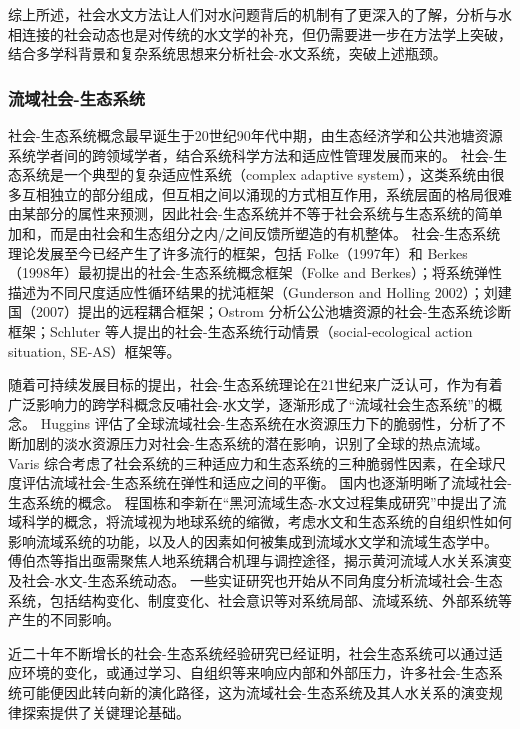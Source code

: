 综上所述，社会水文方法让人们对水问题背后的机制有了更深入的了解，分析与水相连接的社会动态也是对传统的水文学的补充，但仍需要进一步在方法学上突破，结合多学科背景和复杂系统思想来分析社会-水文系统，突破上述瓶颈。


\subsubsection*{流域社会-生态系统}

社会-生态系统概念最早诞生于20世纪90年代中期，由生态经济学和公共池塘资源系统学者间的跨领域学者，结合系统科学方法和适应性管理发展而来的\cite{biggs2021}。
社会-生态系统是一个典型的复杂适应性系统（complex adaptive system），这类系统由很多互相独立的部分组成，但互相之间以涌现的方式相互作用，系统层面的格局很难由某部分的属性来预测，因此社会-生态系统并不等于社会系统与生态系统的简单加和，而是由社会和生态组分之内/之间反馈所塑造的有机整体。 %
社会-生态系统理论发展至今已经产生了许多流行的框架，包括 Folke（1997年）和 Berkes （1998年）最初提出的社会-生态系统概念框架（Folke and Berkes）；将系统弹性描述为不同尺度适应性循环结果的扰沌框架（Gunderson and Holling 2002）；刘建国（2007）提出的远程耦合框架；Ostrom 分析公公池塘资源的社会-生态系统诊断框架；Schluter 等人提出的社会-生态系统行动情景（social-ecological action situation, SE-AS）框架等。

随着可持续发展目标的提出，社会-生态系统理论在21世纪来广泛认可，作为有着广泛影响力的跨学科概念反哺社会-水文学，逐渐形成了“流域社会生态系统”的概念。
Huggins 评估了全球流域社会-生态系统在水资源压力下的脆弱性，分析了不断加剧的淡水资源压力对社会-生态系统的潜在影响，识别了全球的热点流域\cite{huggins2022}。
Varis 综合考虑了社会系统的三种适应力和生态系统的三种脆弱性因素，在全球尺度评估流域社会-生态系统在弹性和适应之间的平衡\cite{varis2019}。
国内也逐渐明晰了流域社会-生态系统的概念。
程国栋和李新\cite{cheng2015}在“黑河流域生态-水文过程集成研究”中提出了流域科学的概念，将流域视为地球系统的缩微，考虑水文和生态系统的自组织性如何影响流域系统的功能，以及人的因素如何被集成到流域水文学和流域生态学中。
傅伯杰\cite{fu2017a}等指出亟需聚焦人地系统耦合机理与调控途径，揭示黄河流域人水关系演变及社会-水文-生态系统动态。
一些实证研究也开始从不同角度分析流域社会-生态系统，包括结构变化\cite{song2022}、制度变化\cite{wang2019d}、社会意识\cite{liu2023}等对系统局部、流域系统、外部系统等产生的不同影响。

近二十年不断增长的社会-生态系统经验研究已经证明，社会生态系统可以通过适应环境的变化，或通过学习、自组织等来响应内部和外部压力，许多社会-生态系统可能便因此转向新的演化路径，这为流域社会-生态系统及其人水关系的演变规律探索提供了关键理论基础。  %
